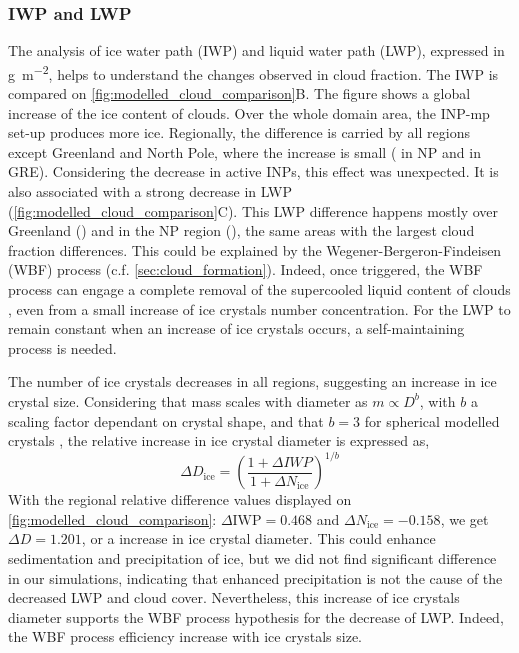     \subsubsection{IWP and LWP}
    The analysis of ice water path (IWP) and liquid water path (LWP), expressed in \si{\gram\per\square\meter}, helps to understand the changes observed in cloud fraction.
    The IWP is compared on \cref{fig:modelled_cloud_comparison}B.
    The figure shows a global increase of the ice content of clouds. Over the whole domain area, the INP-mp set-up produces  more ice.
    Regionally, the difference is carried by all regions except Greenland and North Pole, where the increase is small ( in NP and  in GRE).
    Considering the decrease in active INPs, this effect was unexpected.
    It is also associated with a strong decrease in LWP (\cref{fig:modelled_cloud_comparison}C).
    This LWP difference happens mostly over Greenland () and in the NP region (), the same areas with the largest cloud fraction differences. 
    This could be explained by the Wegener-Bergeron-Findeisen (WBF) process (c.f. \cref{sec:cloud_formation}). Indeed, once triggered, the WBF process can engage a complete removal of the supercooled liquid content of clouds \citep{korolev_effect_2008}, even from a small increase of ice crystals number concentration. 
    For the LWP to remain constant when an increase of ice crystals occurs, a self-maintaining process is needed. 

    The number of ice crystals decreases in all regions, suggesting an increase in ice crystal size.
    Considering that mass scales with diameter as $m \propto D^b$, with $b$ a scaling factor dependant on crystal shape, and that $b = 3$ for spherical modelled crystals \citep{heymsfield_improved_2010}, the relative increase in ice crystal diameter is expressed as,
    \begin{equation}
        \Delta D_{\text{ice}} = \left(\frac{1 + \Delta IWP}{1 + \Delta N_{\text{ice}}}\right)^{1/b}
    \end{equation}
    With the regional relative difference values displayed on \cref{fig:modelled_cloud_comparison}: $\Delta \text{IWP} = 0.468$ and $\Delta N_{\text{ice}} = -0.158$, we get $\Delta D = 1.201$, or a  increase in ice crystal diameter.
    This could enhance sedimentation and precipitation of ice, but we did not find significant difference in our simulations, indicating that enhanced precipitation is not the cause of the decreased LWP and cloud cover. 
    Nevertheless, this increase of ice crystals diameter supports the WBF process hypothesis for the decrease of LWP. Indeed, the WBF process efficiency increase with ice crystals size.

